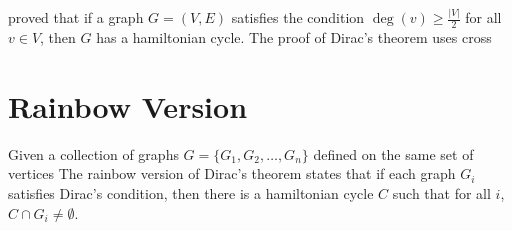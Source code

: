 \cite{dirac1952theorem} proved that if a graph $G = (V, E)$ satisfies the condition $\deg(v) \geq \frac{|V|}{2}$ for all $v \in V$, then $G$ has a hamiltonian cycle.
The proof of Dirac's theorem uses cross

\section{Rainbow Version}

Given a collection of graphs  $G = \{G_1, G_2, \ldots, G_n\}$ defined on the same set of vertices
The rainbow version of Dirac's theorem states that if each graph $G_i$ satisfies Dirac's condition, 
then there is a hamiltonian cycle $C$ such that for all $i$, $C \cap G_i \neq \emptyset$.
